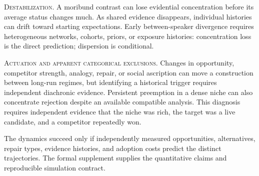 \noindent\textsc{Destabilization.}
\label{sec:destabilization}
A moribund contrast can lose evidential concentration before its average status
changes much. As shared evidence disappears, individual histories can drift
toward starting expectations. Early between-speaker divergence requires
heterogeneous networks, cohorts, priors, or exposure histories:
concentration loss is the direct prediction; dispersion is conditional.

\noindent\textsc{Actuation and apparent categorical exclusions.}
\label{sec:actuation}
\label{sec:categorical-without-bans}
Changes in opportunity, competitor strength, analogy, repair, or social
ascription can move a construction between long-run regimes, but identifying a
historical trigger requires independent diachronic evidence. Persistent
preemption in a dense niche can also concentrate rejection despite an available
compatible analysis. This diagnosis requires independent evidence that the
niche was rich, the target was a live candidate, and a competitor repeatedly
won.

The dynamics succeed only if independently measured opportunities,
alternatives, repair types, evidence histories, and adoption costs predict the
distinct trajectories. The formal supplement supplies the quantitative claims
and reproducible simulation contract.
